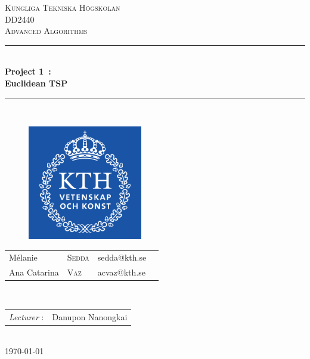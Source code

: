 \documentclass{article}
\begin{document}
\begin{titlepage}
\newcommand{\HRule}{\rule{\linewidth}{0.5mm}} %
\centering %
 
\null
\vspace{2cm}
\textsc{\Large Kungliga Tekniska Högskolan}\\[1cm] %
\textsc{\large DD2440 \\[0.3cm] Advanced Algorithms}\\[0.5cm] %

\vspace{0.5cm}
\HRule \\[0.4cm]
{ \LARGE \bfseries Project 1~: \\ [0.2cm]
\large Euclidean TSP} \\[0.4cm]

\HRule \\[0.5cm]
 
\vspace{1cm}
\begin{figure}[!h]
	\begin{center}
		\includegraphics[width=5cm]{images/kth.png}
	\end{center}
\end{figure}


\vspace{2cm}
\large 
{\begin{tabular}{llll}
 Mélanie & \textsc{Sedda} & sedda@kth.se\\
 Ana Catarina & \textsc{Vaz} & acvaz@kth.se \\
\end{tabular}}
\\[1cm]

\normalsize
{\begin{tabular}{ll}
\textit{Lecturer} : & Danupon Nanongkai\\
\end{tabular}}
\\[1cm]


{\normalsize \today}\\[3cm] %

\newpage

\end{titlepage}


\end{document}
